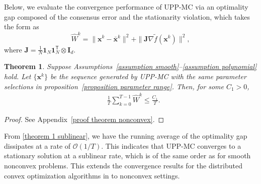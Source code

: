 \documentclass[12pt,draftcls,onecolumn]{IEEEtran}
\newtheorem{theorem}{Theorem}
\begin{document}
Below, we evaluate the convergence performance of UPP-MC via an optimality gap composed of the consensus error and the stationarity violation, which takes the form as
\begin{equation}\label{hatWk}
	\hat{W}^k = \|\mathbf{x}^{k} - \bar{\mathbf{x}}^k\|^2 + \|\mathbf{J}\nabla \tilde{f}(\mathbf{x}^k)\|^2,
\end{equation} 
where $\mathbf{J}=\frac{1}{N}\mathbf{1}_N \mathbf{1}_N ^{\mathsf{T}} \otimes \mathbf{I}_d$. 

\begin{theorem}\label{theorem nonconvex}
	Suppose Assumptions~\ref{assumption smooth}--\ref{assumption polynomial} hold. Let $\{\mathbf{x}^k\}$ be the sequence generated by UPP-MC with the same parameter selections in proposition~\ref{proposition parameter range}. Then, for some $C_1>0$,
	\begin{align}
		\label{theorem 1 sublinear}& \frac{1}{T}\sum _{k=0}^{T-1}\hat{W}^k \leq \frac{C_1}{T}.
	\end{align}

\end{theorem}
\begin{proof}
	See Appendix~\ref{proof theorem nonconvex}.
\end{proof}

From \eqref{theorem 1 sublinear}, we have the running average of the optimality gap dissipates at a rate of $\mathcal{O}(1/T)$. This indicates that UPP-MC converges to a stationary solution at a sublinear rate, which is of the same order as \cite{hong_prox-pda_2017,sun2018distributed,sun_distributed_2019,yi2022sublinear,yi2021linear} for smooth nonconvex problems. This extends the convergence results for the distributed convex optimization algorithms in \cite{shi_extra_2015,nedic_achieving_2017,xu_bregman_2018} to nonconvex settings.
\end{document}

